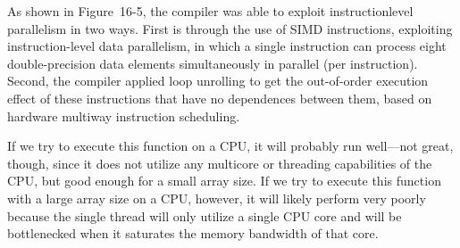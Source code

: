 As shown in Figure 16-5, the compiler was able to exploit instructionlevel parallelism in two ways. First is through the use of SIMD instructions, exploiting instruction-level data parallelism, in which a single instruction can process eight double-precision data elements simultaneously in parallel (per instruction). Second, the compiler applied loop unrolling to get the out-of-order execution effect of these instructions that have no dependences between them, based on hardware multiway instruction scheduling.\par

If we try to execute this function on a CPU, it will probably run well—not great, though, since it does not utilize any multicore or threading capabilities of the CPU, but good enough for a small array size. If we try to execute this function with a large array size on a CPU, however, it will likely perform very poorly because the single thread will only utilize a single CPU core and will be bottlenecked when it saturates the memory bandwidth of that core.\par

























































